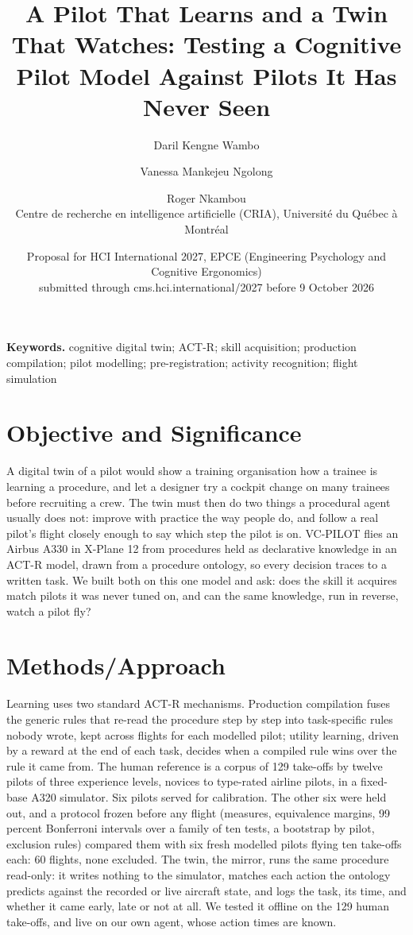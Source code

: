 \documentclass[11pt]{article}
\title{A Pilot That Learns and a Twin That Watches: Testing a Cognitive Pilot Model Against Pilots It Has Never Seen}
\author{Daril Kengne Wambo \and Vanessa Mankejeu Ngolong \and Roger Nkambou\\[4pt]
\small Centre de recherche en intelligence artificielle (CRIA), Universit\'e du Qu\'ebec \`a Montr\'eal}
\date{Proposal for HCI International 2027, EPCE (Engineering Psychology and Cognitive Ergonomics)\\ \small submitted through cms.hci.international/2027 before 9 October 2026}
\begin{document}
\maketitle

\textbf{Keywords.} cognitive digital twin; ACT-R; skill acquisition; production compilation; pilot modelling; pre-registration; activity recognition; flight simulation

\section*{Objective and Significance}
A digital twin of a pilot would show a training organisation how a trainee is learning a procedure, and let a designer try a cockpit change on many trainees before recruiting a crew. The twin must then do two things a procedural agent usually does not: improve with practice the way people do, and follow a real pilot's flight closely enough to say which step the pilot is on. VC-PILOT flies an Airbus A330 in X-Plane 12 from procedures held as declarative knowledge in an ACT-R model, drawn from a procedure ontology, so every decision traces to a written task. We built both on this one model and ask: does the skill it acquires match pilots it was never tuned on, and can the same knowledge, run in reverse, watch a pilot fly?

\section*{Methods/Approach}
Learning uses two standard ACT-R mechanisms. Production compilation fuses the generic rules that re-read the procedure step by step into task-specific rules nobody wrote, kept across flights for each modelled pilot; utility learning, driven by a reward at the end of each task, decides when a compiled rule wins over the rule it came from. The human reference is a corpus of 129 take-offs by twelve pilots of three experience levels, novices to type-rated airline pilots, in a fixed-base A320 simulator. Six pilots served for calibration. The other six were held out, and a protocol frozen before any flight (measures, equivalence margins, 99 percent Bonferroni intervals over a family of ten tests, a bootstrap by pilot, exclusion rules) compared them with six fresh modelled pilots flying ten take-offs each: 60 flights, none excluded. The twin, the mirror, runs the same procedure read-only: it writes nothing to the simulator, matches each action the ontology predicts against the recorded or live aircraft state, and logs the task, its time, and whether it came early, late or not at all. We tested it offline on the 129 human take-offs, and live on our own agent, whose action times are known.
\end{document}
